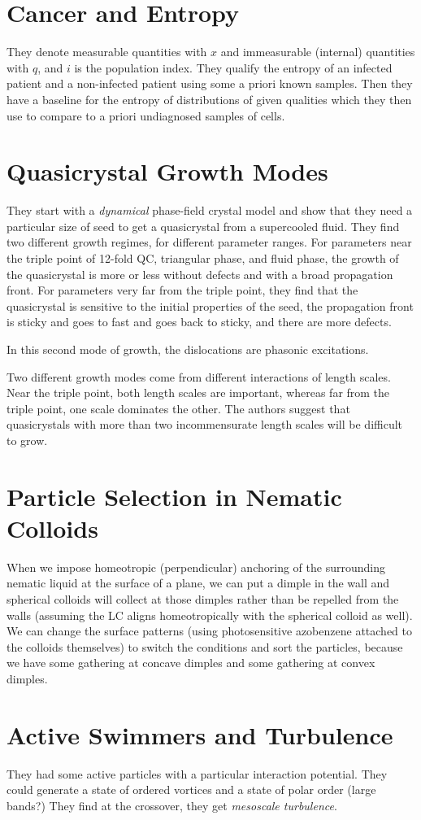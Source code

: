 \documentclass[11pt]{amsart}
\begin{document}
\section{Cancer and Entropy}
They denote measurable quantities with $x$ and immeasurable (internal) quantities with $q$, and $i$ is the population index. They qualify the entropy of an infected patient and a non-infected patient using some a priori known samples. Then they have a baseline for the entropy of distributions of given qualities which they then use to compare to a priori undiagnosed samples of cells.

\section{Quasicrystal Growth Modes}
They start with a \emph{dynamical} phase-field crystal model and show that they need a particular size of seed to get a quasicrystal from a supercooled fluid. They find two different growth regimes, for different parameter ranges. For parameters near the triple point of 12-fold QC, triangular phase, and fluid phase, the growth of the quasicrystal is more or less without defects and with a broad propagation front. For parameters very far from the triple point, they find that the quasicrystal is sensitive to the initial properties of the seed, the propagation front is sticky and goes to fast and goes back to sticky, and there are more defects.

In this second mode of growth, the dislocations are phasonic excitations.

Two different growth modes come from different interactions of length scales. Near the triple point, both length scales are important, whereas far from the triple point, one scale dominates the other. The authors suggest that quasicrystals with more than two incommensurate length scales will be difficult to grow.

\section{Particle Selection in Nematic Colloids}
When we impose homeotropic (perpendicular) anchoring of the surrounding nematic liquid at the surface of a plane, we can put a dimple in the wall and spherical colloids will collect at those dimples rather than be repelled from the walls (assuming the LC aligns homeotropically with the spherical colloid as well). We can change the surface patterns (using photosensitive azobenzene attached to the colloids themselves) to switch the conditions and sort the particles, because we have some gathering at concave dimples and some gathering at convex dimples.

\section{Active Swimmers and Turbulence}
They had some active particles with a particular interaction potential. They could generate a state of ordered vortices and a state of polar order (large bands?) They find at the crossover, they get \emph{mesoscale turbulence}.
\end{document}
